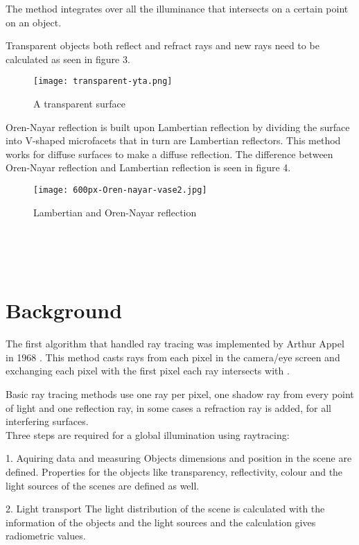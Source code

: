 \documentclass[a4paper,12pt]{IEEEtran}
\begin{document}
The method integrates over all the illuminance that intersects on a certain point on an object\cite{Path tracing}.

Transparent objects both reflect and refract rays and new rays need to be calculated as seen in figure 3.
\begin{figure}[h!]
\texttt{[image: transparent-yta.png]}
\caption{A transparent surface}
\end{figure}

Oren-Nayar reflection is built upon Lambertian reflection by dividing the surface into V-shaped microfacets that in turn are Lambertian reflectors. This method works for diffuse surfaces to make a diffuse reflection. The difference between Oren-Nayar reflection and Lambertian reflection is seen in figure 4.
\begin{figure}[h!]
\texttt{[image: 600px-Oren-nayar-vase2.jpg]}
\caption{Lambertian and Oren-Nayar reflection}
\end{figure}
\\
\\
\\








\section{Background}

The first algorithm that handled ray tracing was implemented by Arthur Appel in 1968 \cite{Arthur Appel}. This method casts rays from each pixel in the camera/eye screen and exchanging each pixel with the first pixel each ray intersects with \cite{Basic Raytracing}. 

Basic ray tracing methods use one ray per pixel, one shadow ray from every point of light and one reflection ray, in some cases a refraction ray is added, for all interfering surfaces.\\



Three steps are required for a global illumination using raytracing:

1. Aquiring data and measuring
	Objects dimensions and position in the scene are defined. Properties for the objects like transparency, reflectivity, colour and the light sources of the scenes are defined as well.
    
2. Light transport 
	The light distribution of the scene is calculated with the information of the objects and the light sources and the calculation gives radiometric values.
    
\end{document}
